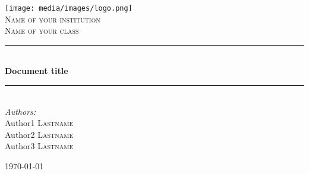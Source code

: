 \newcommand{\HRule}{\rule{\linewidth}{0.5mm}}

\begin{titlepage}
\begin{center}

\texttt{[image: media/images/logo.png]}\\[1cm]
\textsc{\LARGE Name of your institution}\\[1.5cm]
\textsc{\Large Name of your class}\\[0.5cm]


\HRule \\[0.4cm]
{ \huge \bfseries Document title}\\[0.4cm]
\HRule \\[1.5cm]


\emph{Authors:}\\
Author1 \textsc{Lastname}\\
Author2 \textsc{Lastname}\\
Author3 \textsc{Lastname}\\

\vfill

{\large \today}

\end{center}
\end{titlepage}


